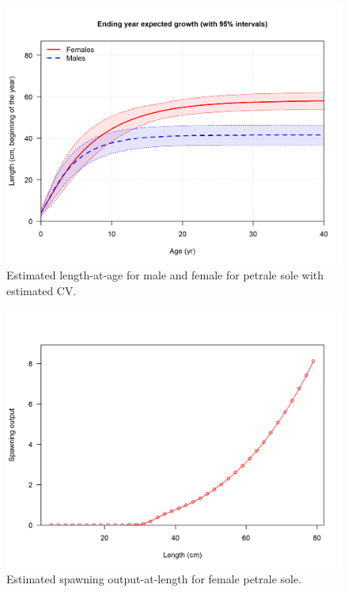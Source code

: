 \documentclass[12pt,]{article}
\begin{document}
\FloatBarrier 

\begin{figure}
\centering
\includegraphics{r4ss/plots_mod1/bio1_sizeatage.png}
\caption{Estimated length-at-age for male and female for petrale sole
with estimated CV. \label{fig:sizeatage}}
\end{figure}

\FloatBarrier 

\begin{figure}
\centering
\includegraphics{r4ss/plots_mod1/bio10_spawningoutput_len.png}
\caption{Estimated spawning output-at-length for female petrale sole.
\label{fig:spawnoutlen}}
\end{figure}
\end{document}
